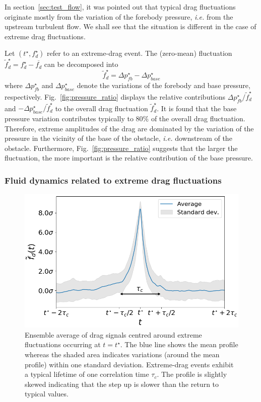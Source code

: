 \documentclass{jfm}
\begin{document}
%
In section~\ref{sec:test_flow}, it was pointed out that typical drag fluctuations originate mostly from the variation of the forebody pressure, \textit{i.e.} from the upstream turbulent flow.
We shall see that the situation is different in the case of {extreme} drag fluctuations. 

%
Let $(t^{\star}, f_d^{\star})$ refer to an extreme-drag event.
The (zero-mean) fluctuation $\tilde{f}_d^{\star} = f_d^{\star} - \overline{f_d}$ can be  decomposed into 
\begin{equation}
  \tilde{f}_d^{\star} = \Delta p_{fb}^{\star} - \Delta p_{base}^{\star}
\end{equation}
where $\Delta p_{fb}^{\star}$ and $\Delta p_{base}^{\star}$ denote the variations of the forebody and base pressure, respectively.
%
Fig.~\ref{fig:pressure_ratio} displays the relative contributions
$\Delta p_{fb}^{\star}/\tilde{f}_d^{\star}$ and $-\Delta p_{base}^{\star}/\tilde{f}_d^{\star}$ to the overall drag fluctuation $\tilde f_d^{\star}$.
%
It is found that the base pressure variation contributes typically to $80\%$ of the overall drag fluctuation.
Therefore, extreme amplitudes of the drag are dominated by the variation of the pressure in the vicinity of the base of the obstacle, \emph{i.e.} downstream of the obstacle.
Furthermore, Fig.~\ref{fig:pressure_ratio} suggests that the larger the fluctuation, the more important is the relative contribution of the base pressure. 

\subsubsection{Fluid dynamics related to extreme drag fluctuations}
\label{sec:dynamical_aspects}

\begin{figure}
	\centering
	\includegraphics[width=.7\linewidth]{timeseries_extremes/timeseries_extremes.png}
	\caption{\label{fig:timeseries_extremes} Ensemble average of drag signals centred around extreme fluctuations occurring  at $t=t^{\star}$. The blue line shows the mean profile whereas the shaded area indicates variations (around the mean profile) within one standard deviation. Extreme-drag events exhibit a typical lifetime of one correlation time $\tau_c$. The profile is slightly skewed indicating that the step up is slower than the return to typical values.}
\end{figure}
\end{document}

